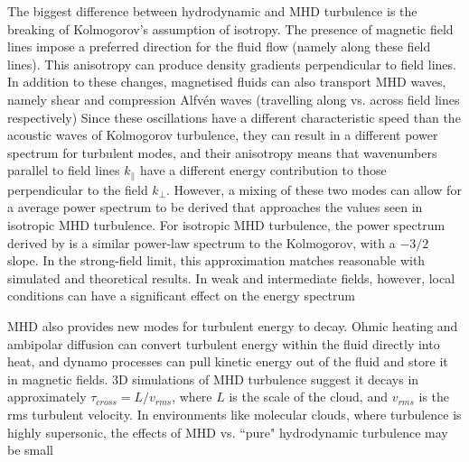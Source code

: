 \documentclass[12pt, preprint]{aastex}
\begin{document}
The biggest difference between hydrodynamic and MHD turbulence is the breaking
of Kolmogorov's assumption of isotropy.  The presence of magnetic field lines
impose a preferred direction for the fluid flow (namely along these field
lines).  This anisotropy can produce density gradients perpendicular to field
lines.  In addition to these changes, magnetised fluids can also transport MHD
waves, namely shear and compression Alfv\'{e}n waves (travelling along vs.
across field lines respectively)\citep{elm2004}  Since these oscillations have a different
characteristic speed than the acoustic waves of Kolmogorov turbulence, they can
result in a different power spectrum for turbulent modes, and their anisotropy
means that wavenumbers parallel to field lines $k_\parallel$ have a different
energy contribution to those perpendicular to the field $k_\perp$.  However, a
mixing of these two modes can allow for a average power spectrum to be derived
that approaches the values seen in isotropic MHD turbulence.  For
isotropic MHD turbulence, the power spectrum derived by \citet{irosh1964} is a
similar power-law spectrum to the Kolmogorov, with a $-3/2$ slope.  In the
strong-field limit, this approximation matches reasonable with simulated and
theoretical results.  In weak and intermediate fields, however, local conditions
can have a significant effect on the energy spectrum\citep{elm2004}

MHD also provides new modes for turbulent energy to decay.  Ohmic heating and
ambipolar diffusion can convert turbulent energy within the fluid directly into
heat, and dynamo processes can pull kinetic energy out of the fluid and store it
in magnetic fields.  3D simulations of MHD turbulence suggest it decays in
approximately $\tau_{cross} = L/v_{rms}$, where $L$ is the scale of the cloud,
and $v_{rms}$ is the rms turbulent velocity. In environments like molecular
clouds, where turbulence is highly supersonic, the effects of MHD vs. ``pure"
hydrodynamic turbulence may be small \citep{elm2004}
\end{document}
